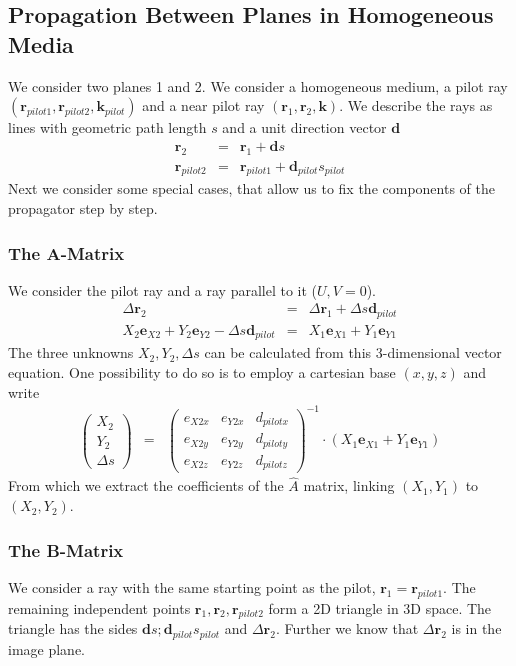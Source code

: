 \documentclass[12pt,a4paper,twoside,openright,BCOR10mm,headsepline,titlepage,abstracton,chapterprefix,final]{scrreprt}
\newcommand\Vector[1]{{\mathbf{#1}}}
\newcommand\wavenumber{k}
\newcommand\Wavevector{\Vector{\wavenumber}}
\begin{document}
\subsection{Propagation Between Planes in Homogeneous Media}
We consider two planes 1 and 2.
We consider a homogeneous medium, a pilot ray $( \Vector{r}_{pilot1}, \Vector{r}_{pilot2}, \Wavevector_{pilot} )$
and a near pilot ray $( \Vector{r}_{1}, \Vector{r}_{2}, \Wavevector )$. 
We describe the rays as lines with geometric path length $s$ and a unit direction vector $\Vector{d}$
\begin{eqnarray}
 \Vector{r}_{2} &=& \Vector{r}_{1} + \Vector{d} s  \\
 \Vector{r}_{pilot2} &=& \Vector{r}_{pilot1} + \Vector{d}_{pilot} s_{pilot}
\end{eqnarray}
Next we consider some special cases, that allow us to fix the components of the propagator step by step.

\subsubsection{The A-Matrix}
We consider the pilot ray and a ray parallel to it ($U,V=0$).
\begin{eqnarray}
 \Delta \Vector{r}_2 &=& \Delta \Vector{r}_1 + \Delta s \Vector{d}_{pilot} \\
 X_2 \Vector{e}_{X2} +  Y_2 \Vector{e}_{Y2} - \Delta s \Vector{d}_{pilot} &=&  X_1 \Vector{e}_{X1} +  Y_1 \Vector{e}_{Y1} 
\end{eqnarray}
The three unknowns $X_2 , Y_2, \Delta s$ can be calculated from this 3-dimensional vector equation.
One possibility to do so is to employ a cartesian base $(x,y,z)$ and write
\begin{eqnarray}
 \begin{pmatrix}
  X_2 \\ Y_2 \\ \Delta s
 \end{pmatrix}
 &=&
 \begin{pmatrix}
  e_{X2x} & e_{Y2x} & d_{pilotx} \\
  e_{X2y} & e_{Y2y} & d_{piloty} \\
  e_{X2z} & e_{Y2z} & d_{pilotz}  
 \end{pmatrix}^{-1}
 \cdot
 \left(
 X_1 \Vector{e}_{X1} + Y_1 \Vector{e}_{Y1}
 \right)
\end{eqnarray}
From which we extract the coefficients of the $\hat{A}$ matrix, 
linking $(X_1,Y_1)$ to $(X_2,Y_2)$.

\subsubsection{The B-Matrix}
We consider a ray with the same starting point as the pilot, $\Vector{r}_{1} = \Vector{r}_{pilot1}$. 
The remaining independent points $\Vector{r}_{1}, \Vector{r}_{2}, \Vector{r}_{pilot2}$ form a 2D triangle in 3D space.
The triangle has the sides $\Vector{d} s ; \Vector{d}_{pilot} s_{pilot}$ and $\Delta \Vector{r}_2$. 
Further we know that $\Delta \Vector{r}_2$ is in the image plane.
\end{document}
